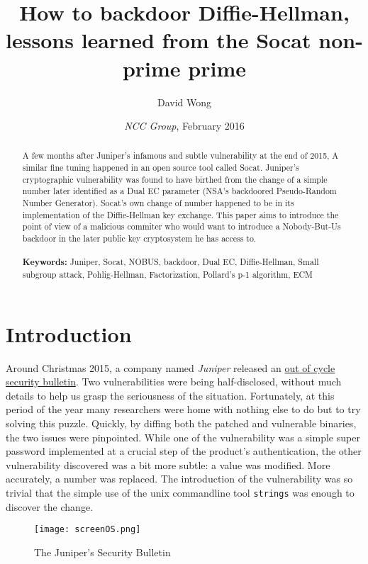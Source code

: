 \documentclass[a4paper,11pt]{article}
\title{How to backdoor Diffie-Hellman, lessons learned from the Socat non-prime prime}
\author{David Wong}
\date{\emph{NCC Group}, \small{February 2016}}
\begin{document}
\maketitle

\renewcommand{\abstractname}{Abstract}
\begin{abstract}
A few months after Juniper's infamous and subtle vulnerability at the end of 2015, A similar fine tuning happened in an open source tool called Socat. Juniper's cryptographic vulnerability was found to have birthed from the change of a simple number later identified as a Dual EC parameter (NSA's backdoored Pseudo-Random Number Generator). Socat's own change of number happened to be in its implementation of the Diffie-Hellman key exchange. This paper aims to introduce the point of view of a malicious commiter who would want to introduce a Nobody-But-Us backdoor in the later public key cryptosystem he has access to.\\
\\
\textbf{Keywords:} Juniper, Socat, NOBUS, backdoor, Dual EC, Diffie-Hellman, Small subgroup attack, Pohlig-Hellman, Factorization, Pollard's p-1 algorithm, ECM\\

\end{abstract}

\section{Introduction}\label{introduction}

Around Christmas 2015, a company named \emph{Juniper} released an \href{https://kb.juniper.net/InfoCenter/index?page=content&id=JSA10713&actp=search}{out of cycle security bulletin}. Two vulnerabilities were being half-disclosed, without much details to help us grasp the seriousness of the situation. Fortunately, at this period of the year many researchers were home with nothing else to do but to try  solving this puzzle. Quickly, by diffing both the patched and vulnerable binaries, the two issues were pinpointed. While one of the vulnerability was a simple super password implemented at a crucial step of the product's authentication, the other vulnerability discovered was a bit more subtle: a value was modified. More accurately, a number was replaced. The introduction of the vulnerability was so trivial that the simple use of the unix commandline tool \texttt{strings} was enough to discover the change.

\begin{figure}[H]
\centering
\texttt{[image: screenOS.png]}
\caption{The Juniper's Security Bulletin}\label{screenOS}
\end{figure}
\end{document}
